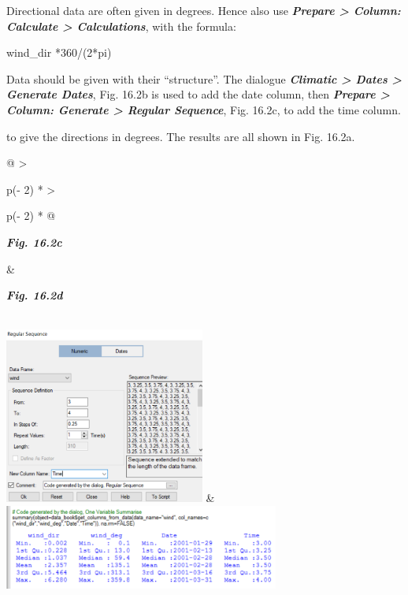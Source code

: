 \documentclass[
  letterpaper,
  DIV=11,
  numbers=noendperiod]{scrreprt}
\begin{document}
Directional data are often given in degrees. Hence also use
\textbf{\emph{Prepare \textgreater{} Column: Calculate \textgreater{}
Calculations}}, with the formula:

wind\_dir *360/(2*pi)

Data should be given with their ``structure''. The dialogue
\textbf{\emph{Climatic \textgreater{} Dates \textgreater{} Generate
Dates}}, Fig. 16.2b is used to add the date column, then
\textbf{\emph{Prepare \textgreater{} Column: Generate \textgreater{}
Regular Sequence}}, Fig. 16.2c, to add the time column.

to give the directions in degrees. The results are all shown in Fig.
16.2a.

\begin{longtable}[]{@{}
  >{\raggedright\arraybackslash}p{(\columnwidth - 2\tabcolsep) * }
  >{\raggedright\arraybackslash}p{(\columnwidth - 2\tabcolsep) * }@{}}
\toprule\noalign{}
\begin{minipage}[b]{\linewidth}\raggedright
\textbf{\emph{Fig. 16.2c}}
\end{minipage} & \begin{minipage}[b]{\linewidth}\raggedright
\textbf{\emph{Fig. 16.2d}}
\end{minipage} \\
\midrule\noalign{}
\endhead
\bottomrule\noalign{}
\endlastfoot
\includegraphics[width=2.59247in,height=2.27823in]{figures/Fig16.2c.png}
&
\includegraphics[width=3.56423in,height=1.09762in]{figures/Fig16.2d.png} \\
\end{longtable}
\end{document}

